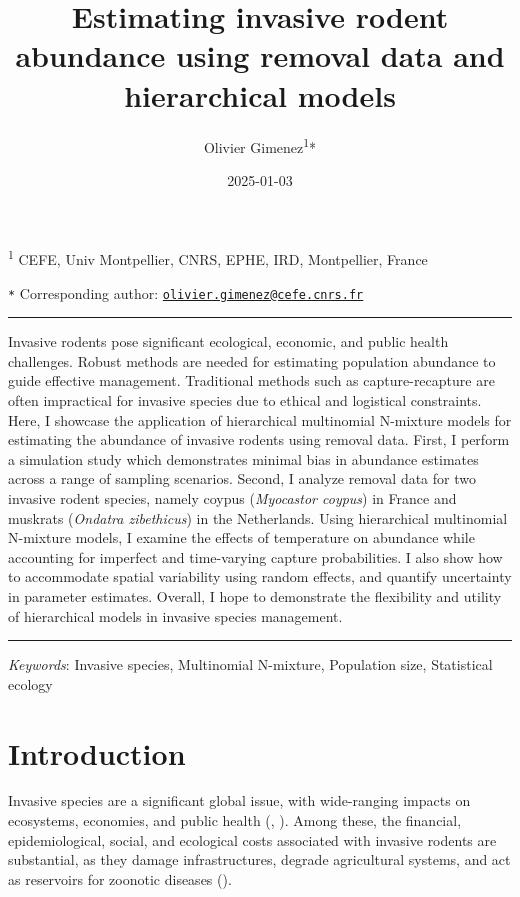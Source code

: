 \documentclass[
  11pt,
  a4paper,
]{article}
\title{Estimating invasive rodent abundance using removal data and hierarchical models}
\author{Olivier Gimenez\textsuperscript{1}*}
\date{2025-01-03}
\begin{document}
\maketitle

\linenumbers

\small

\textsuperscript{1} CEFE, Univ Montpellier, CNRS, EPHE, IRD, Montpellier, France

\texttt{*} Corresponding author: \href{mailto:olivier.gimenez@cefe.cnrs.fr}{\nolinkurl{olivier.gimenez@cefe.cnrs.fr}}

\normalsize

\vspace{1cm}
\hrule

Invasive rodents pose significant ecological, economic, and public health challenges. Robust methods are needed for estimating population abundance to guide effective management. Traditional methods such as capture-recapture are often impractical for invasive species due to ethical and logistical constraints. Here, I showcase the application of hierarchical multinomial N-mixture models for estimating the abundance of invasive rodents using removal data. First, I perform a simulation study which demonstrates minimal bias in abundance estimates across a range of sampling scenarios. Second, I analyze removal data for two invasive rodent species, namely coypus (\emph{Myocastor coypus}) in France and muskrats (\emph{Ondatra zibethicus}) in the Netherlands. Using hierarchical multinomial N-mixture models, I examine the effects of temperature on abundance while accounting for imperfect and time-varying capture probabilities. I also show how to accommodate spatial variability using random effects, and quantify uncertainty in parameter estimates. Overall, I hope to demonstrate the flexibility and utility of hierarchical models in invasive species management.

\vspace{3mm}
\hrule
\vspace{5mm}

\emph{Keywords}: Invasive species, Multinomial N-mixture, Population size, Statistical ecology

\newpage

\section{Introduction}\label{introduction}

Invasive species are a significant global issue, with wide-ranging impacts on ecosystems, economies, and public health (, ). Among these, the financial, epidemiological, social, and ecological costs associated with invasive rodents are substantial, as they damage infrastructures, degrade agricultural systems, and act as reservoirs for zoonotic diseases ().
\end{document}
